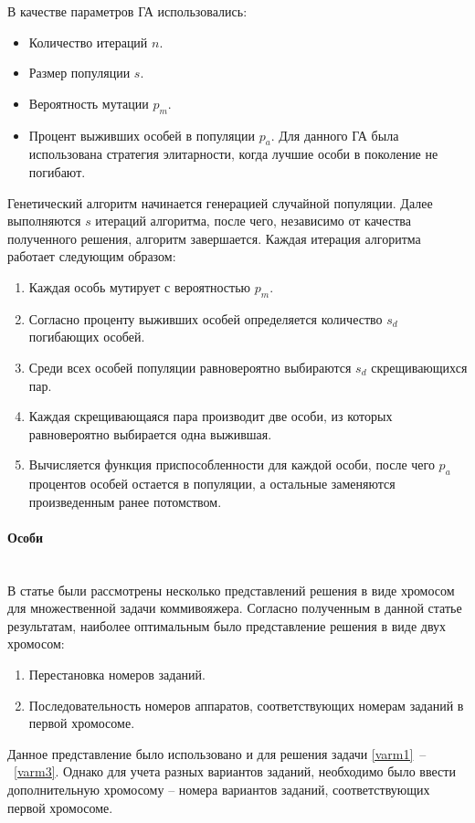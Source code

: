 \documentclass[a4paper,14pt,russian]{article}
\begin{document}
В качестве параметров ГА использовались:
\begin{itemize}
\item Количество итераций $n$.
\item Размер популяции $s$.
\item Вероятность мутации $p_m$.
\item Процент выживших особей в популяции $p_a$. Для данного ГА была использована стратегия элитарности, когда лучшие особи в поколение не погибают.
\end{itemize}

Генетический алгоритм начинается генерацией случайной популяции.
Далее выполняются $s$ итераций алгоритма, после чего, независимо от качества полученного решения, алгоритм завершается.
Каждая итерация алгоритма работает следующим образом:
\begin{enumerate}
\item Каждая особь мутирует с вероятностью $p_m$.
\item Согласно проценту выживших особей определяется количество $s_d$ погибающих особей.
\item Среди всех особей популяции равновероятно выбираются $s_d$ скрещивающихся пар.
\item Каждая скрещивающаяся пара производит две особи, из которых равновероятно выбирается одна выжившая.
\item Вычисляется функция приспособленности для каждой особи, после чего $p_a$ процентов особей остается в популяции, а остальные заменяются произведенным ранее потомством.
\end{enumerate}

\paragraph{Особи} ~\\
В статье \cite{kiraly2010novel} были рассмотрены несколько представлений решения в виде хромосом для множественной задачи коммивояжера. Согласно полученным в данной статье результатам, наиболее оптимальным было представление решения в виде двух хромосом:
\begin{enumerate}
\item Перестановка номеров заданий.
\item Последовательность номеров аппаратов, соответствующих номерам заданий в первой хромосоме.
\end{enumerate}

Данное представление было использовано и для решения задачи \eqref{varm1}~--~\eqref{varm3}. Однако для учета разных вариантов заданий, необходимо было ввести дополнительную хромосому -- номера вариантов заданий, соответствующих первой хромосоме.
\end{document}
